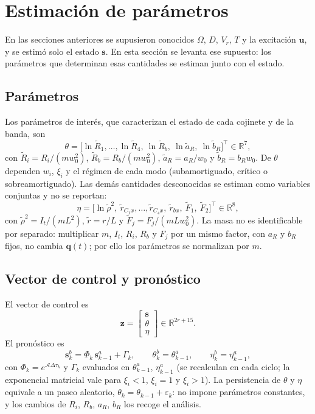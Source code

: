 \section{Estimación de parámetros}

En las secciones anteriores se supusieron conocidos $\Omega$, $D$, $V_r$, $T$ y la excitación $\mathbf u$, y se estimó solo el estado $\mathbf s$. En esta sección se levanta ese supuesto: los parámetros que determinan esas cantidades se estiman junto con el estado.

\subsection{Parámetros}

Los parámetros de interés, que caracterizan el estado de cada cojinete y de la banda, son
\[
\theta=\big[\ln\tilde R_1,\ldots,\ln\tilde R_4,\ \ln\tilde R_b,\ \ln\tilde a_R,\ \ln\tilde b_R\big]^\top\in\mathbb R^{7},
\]
con $\tilde R_i=R_i/(mw_0^2)$, $\tilde R_b=R_b/(mw_0^2)$, $\tilde a_R=a_R/w_0$ y $\tilde b_R=b_Rw_0$. De $\theta$ dependen $w_i$, $\xi_i$ y el régimen de cada modo (subamortiguado, crítico o sobreamortiguado). Las demás cantidades desconocidas se estiman como variables conjuntas y no se reportan:
\[
\eta=\big[\ln\tilde\rho^2,\ \tilde r_{C_1x},\ldots,\tilde r_{C_4x},\ \tilde r_{bx},\ \tilde F_1,\ \tilde F_2\big]^\top\in\mathbb R^{8},
\]
con $\tilde\rho^2=I_t/(mL^2)$, $\tilde r=r/L$ y $\tilde F_j=F_j/(mLw_0^2)$. La masa no es identificable por separado: multiplicar $m$, $I_t$, $R_i$, $R_b$ y $F_j$ por un mismo factor, con $a_R$ y $b_R$ fijos, no cambia $\mathbf q(t)$; por ello los parámetros se normalizan por $m$.

\subsection{Vector de control y pronóstico}

El vector de control es
\[
\mathbf z=\begin{bmatrix}\mathbf s\\\theta\\\eta\end{bmatrix}\in\mathbb R^{2r+15}.
\]
El pronóstico es
\[
\mathbf s^b_k=\Phi_k\,\mathbf s^a_{k-1}+\Gamma_k,\qquad
\theta^b_k=\theta^a_{k-1},\qquad
\eta^b_k=\eta^a_{k-1},
\]
con $\Phi_k=e^{\mathcal A\Delta\tau_k}$ y $\Gamma_k$ evaluados en $\theta^a_{k-1}$, $\eta^a_{k-1}$ (se recalculan en cada ciclo; la exponencial matricial vale para $\xi_i<1$, $\xi_i=1$ y $\xi_i>1$). La persistencia de $\theta$ y $\eta$ equivale a un paseo aleatorio, $\theta_k=\theta_{k-1}+\varepsilon_k$: no impone parámetros constantes, y los cambios de $R_i$, $R_b$, $a_R$, $b_R$ los recoge el análisis.

